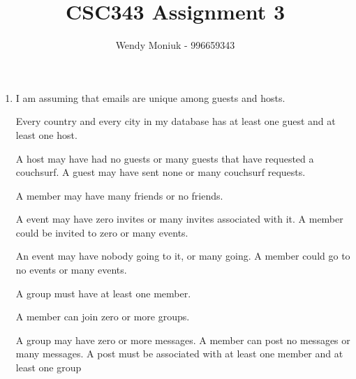 \documentclass[10pt,a4paper]{article}
\author{Wendy Moniuk - 996659343}
\title{CSC343 Assignment 3}
\begin{document}
\begin{enumerate}

\item I am assuming that emails are unique among guests and hosts.

Every country and every city in my database has at least one guest and at least one host.

A host may have had no guests or many guests that have requested a couchsurf. A guest may have sent none or many couchsurf requests.

A member may have many friends or no friends.

A event may have zero invites or many invites associated with it. A member could be invited to zero or many events.

An event may have nobody going to it, or many going. A member could go to no events or many events.

A group must have at least one member.

A member can join zero or more groups.

A group may have zero or more messages. A member can post no messages or many messages. A post must be associated with at least one member and at least one group

\end{enumerate}
\end{document}
